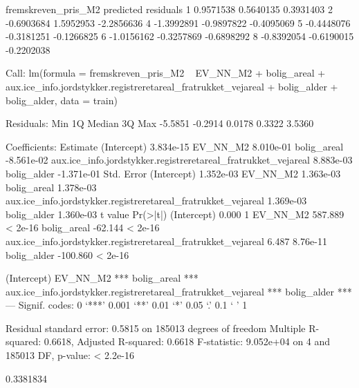 \documentclass{report}
\begin{document}
\begin{Schunk}
\begin{Soutput}
  fremskreven_pris_M2  predicted  residuals
1           0.9571538  0.5640135  0.3931403
2          -0.6903684  1.5952953 -2.2856636
4          -1.3992891 -0.9897822 -0.4095069
5          -0.4448076 -0.3181251 -0.1266825
6          -1.0156162 -0.3257869 -0.6898292
8          -0.8392054 -0.6190015 -0.2202038
\end{Soutput}
\begin{Soutput}
Call:
lm(formula = fremskreven_pris_M2 ~ EV_NN_M2 + bolig_areal + aux.ice_info.jordstykker.registreretareal_fratrukket_vejareal + 
    bolig_alder + bolig_alder, data = train)

Residuals:
    Min      1Q  Median      3Q     Max 
-5.5851 -0.2914  0.0178  0.3322  3.5360 

Coefficients:
                                                                Estimate
(Intercept)                                                    3.834e-15
EV_NN_M2                                                       8.010e-01
bolig_areal                                                   -8.561e-02
aux.ice_info.jordstykker.registreretareal_fratrukket_vejareal  8.883e-03
bolig_alder                                                   -1.371e-01
                                                              Std. Error
(Intercept)                                                    1.352e-03
EV_NN_M2                                                       1.363e-03
bolig_areal                                                    1.378e-03
aux.ice_info.jordstykker.registreretareal_fratrukket_vejareal  1.369e-03
bolig_alder                                                    1.360e-03
                                                               t value Pr(>|t|)
(Intercept)                                                      0.000        1
EV_NN_M2                                                       587.889  < 2e-16
bolig_areal                                                    -62.144  < 2e-16
aux.ice_info.jordstykker.registreretareal_fratrukket_vejareal    6.487 8.76e-11
bolig_alder                                                   -100.860  < 2e-16
                                                                 
(Intercept)                                                      
EV_NN_M2                                                      ***
bolig_areal                                                   ***
aux.ice_info.jordstykker.registreretareal_fratrukket_vejareal ***
bolig_alder                                                   ***
---
Signif. codes:  0 ‘***’ 0.001 ‘**’ 0.01 ‘*’ 0.05 ‘.’ 0.1 ‘ ’ 1

Residual standard error: 0.5815 on 185013 degrees of freedom
Multiple R-squared:  0.6618,	Adjusted R-squared:  0.6618 
F-statistic: 9.052e+04 on 4 and 185013 DF,  p-value: < 2.2e-16
\end{Soutput}
\begin{Soutput}
[1] 0.3381834
\end{Soutput}
\end{Schunk}
\end{document}
